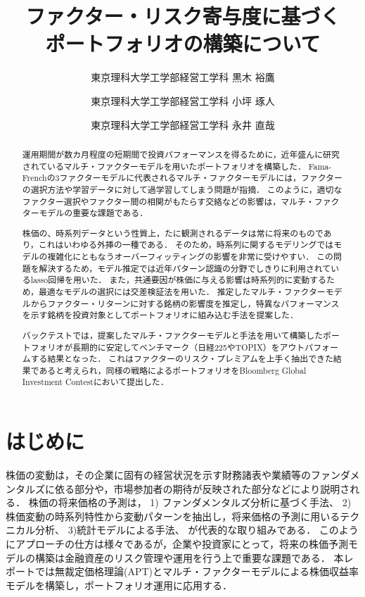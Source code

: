 ﻿\documentclass[11pt]{jreport}
\begin{document}
\title{ファクター・リスク寄与度に基づく\\ポートフォリオの構築について\\}
\author{東京理科大学工学部経営工学科 \quad 黒木 裕鷹 \and 東京理科大学工学部経営工学科 \quad 小坪 琢人 \and 東京理科大学工学部経営工学科 \quad 永井 直哉}
\maketitle
{}
\tableofcontents

\begin{abstract}

運用期間が数カ月程度の短期間で投資パフォーマンスを得るために，近年盛んに研究されているマルチ・ファクターモデルを用いたポートフォリオを構築した．
Fama-Frenchの3ファクターモデルに代表されるマルチ・ファクターモデルには，ファクターの選択方法や学習データに対して過学習してしまう問題が指摘．
このように，適切なファクター選択やファクター間の相関がもたらす交絡などの影響は，マルチ・ファクターモデルの重要な課題である．

株価の、時系列データという性質上，たに観測されるデータは常に将来のものであり，これはいわゆる外挿の一種である．
そのため，時系列に関するモデリングではモデルの複雑化にともなうオーバーフィッティングの影響を非常に受けやすい．
この問題を解決するため，モデル推定では近年パターン認識の分野でしきりに利用されているlasso回帰を用いた．
また，共通要因が株価に与える影響は時系列的に変動するため，最適なモデルの選択には交差検証法を用いた．
推定したマルチ・ファクターモデルからファクター・リターンに対する銘柄の影響度を推定し，特異なパフォーマンスを示す銘柄を投資対象としてポートフォリオに組み込む手法を提案した．

バックテストでは，提案したマルチ・ファクターモデルと手法を用いて構築したポートフォリオが長期的に安定してベンチマーク（日経225やTOPIX）をアウトパフォームする結果となった． 
これはファクターのリスク・プレミアムを上手く抽出できた結果であると考えられ，同様の戦略によるポートフォリオをBloomberg Global Investment Contestにおいて提出した．
\end{abstract}









\chapter{はじめに}
株価の変動は，その企業に固有の経営状況を示す財務諸表や業績等のファンダメンタルズに依る部分や，市場参加者の期待が反映された部分などにより説明される．
株価の将来価格の予測は，
1) ファンダメンタルズ分析に基づく手法、
2) 株価変動の時系列特性から変動パターンを抽出し，将来価格の予測に用いるテクニカル分析、
3)統計モデルによる手法、
が代表的な取り組みである．
このようにアプローチの仕方は様々であるが，企業や投資家にとって，将来の株価予測モデルの構築は金融資産のリスク管理や運用を行う上で重要な課題である．
本レポートでは無裁定価格理論(APT)とマルチ・ファクターモデルによる株価収益率モデルを構築し，ポートフォリオ運用に応用する．
\end{document}
